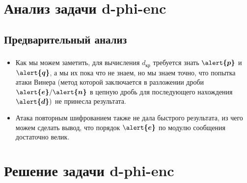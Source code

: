 \documentclass[t]{beamer}
\begin{document}
\section{Анализ задачи d-phi-enc}
\subsection{Предварительный анализ}
\begin{frame}
	\frametitle{\insertsection}
	\framesubtitle{\insertsubsection}
    \begin{itemize}
        \item Как мы можем заметить, для вычисления $d_{кр}$ требуется знать $\boldsymbol{\alert{p}}$ и $\boldsymbol{\alert{q}}$, а мы их пока что не знаем, но мы знаем точно, что попытка атаки Винера (метод которой заключается в разложении дроби $\boldsymbol{\alert{e}}/\boldsymbol{\alert{n}}$ в цепную дробь для последующего нахождения $\boldsymbol{\alert{d}})$ не принесла результата.\newline
        \item Атака повторным шифрованием также не дала быстрого результата, из чего можем сделать вывод, что порядок $\boldsymbol{\alert{e}}$ по модулю сообщения достаточно велик.
    \end{itemize}
\end{frame}

\section{Решение задачи d-phi-enc}
\end{document}
